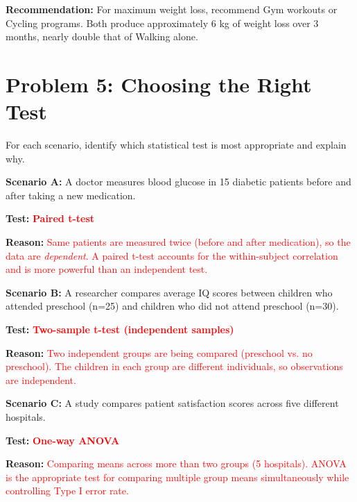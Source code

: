 \documentclass[11pt]{article}
\begin{document}
\textbf{Recommendation:} For maximum weight loss, recommend Gym workouts or Cycling programs. Both produce approximately 6 kg of weight loss over 3 months, nearly double that of Walking alone.

\newpage

\section{Problem 5: Choosing the Right Test}

For each scenario, identify which statistical test is most appropriate and explain why.

\vspace{0.5cm}

\textbf{Scenario A:} A doctor measures blood glucose in 15 diabetic patients before and after taking a new medication.

\textbf{Test:} \textcolor{red}{\textbf{Paired t-test}}

\textbf{Reason:} \textcolor{red}{Same patients are measured twice (before and after medication), so the data are \textit{dependent}. A paired t-test accounts for the within-subject correlation and is more powerful than an independent test.}

\vspace{0.5cm}

\textbf{Scenario B:} A researcher compares average IQ scores between children who attended preschool (n=25) and children who did not attend preschool (n=30).

\textbf{Test:} \textcolor{red}{\textbf{Two-sample t-test (independent samples)}}

\textbf{Reason:} \textcolor{red}{Two independent groups are being compared (preschool vs. no preschool). The children in each group are different individuals, so observations are independent.}

\vspace{0.5cm}

\textbf{Scenario C:} A study compares patient satisfaction scores across five different hospitals.

\textbf{Test:} \textcolor{red}{\textbf{One-way ANOVA}}

\textbf{Reason:} \textcolor{red}{Comparing means across more than two groups (5 hospitals). ANOVA is the appropriate test for comparing multiple group means simultaneously while controlling Type I error rate.}

\vspace{0.5cm}
\end{document}
